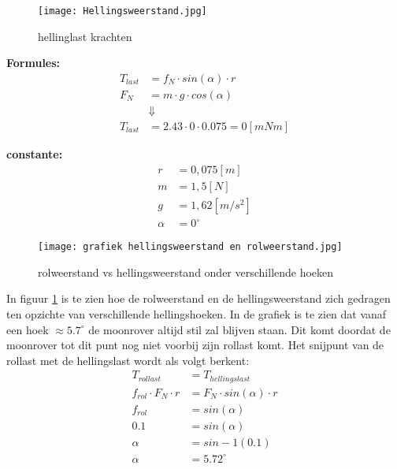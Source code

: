     \begin{figure}[H]
        \centering
        \texttt{[image: Hellingsweerstand.jpg]}
        \caption{hellinglast krachten}
    \end{figure}

    \begin{multicols}{2}
        \textbf{Formules:}
        \begin{equation}
            \begin{split}
                T_{last} &= f_{N} \cdot sin(\alpha) \cdot r \\
                F_{N} &= m \cdot g \cdot cos(\alpha) \\
                &\Downarrow \\
                T_{last} &= 2.43 \cdot 0 \cdot 0.075 = 0 [mNm]
            \end{split}
        \end{equation}

        \textbf{constante:}
        \begin{equation*}
            \begin{split}
                r &= 0,075 [m] \\
                m &= 1,5 [N] \\
                g &= 1,62 [m/s^2] \\
                \alpha &= 0^\circ 
            \end{split}
        \end{equation*}
    \end{multicols}

    \begin{figure}[H]
        \centering
        \texttt{[image: grafiek hellingsweerstand en rolweerstand.jpg]}
        \caption{rolweerstand vs hellingsweerstand onder verschillende hoeken}
        \label{fig:birds}
    \end{figure}

    In figuur \ref{fig:birds} is te zien hoe de rolweerstand en de hellingsweerstand zich gedragen ten opzichte van verschillende hellingshoeken. In de grafiek is te zien dat vanaf een hoek $\approx 5.7^\circ$ de moonrover altijd stil zal blijven staan. Dit komt doordat de moonrover tot dit punt nog niet voorbij zijn rollast komt. Het snijpunt van de rollast met de hellingslast wordt als volgt berkent:
    \begin{equation}
        \begin{split}
            T_{rollast} &= T_{hellingslast} \\
            f_{rol} \cdot F_{N} \cdot r &= F_{N} \cdot sin(\alpha) \cdot r \\
            f_{rol} &= sin(\alpha) \\
            0.1 &= sin(\alpha) \\
            \alpha &= sin-1(0.1) \\
            \alpha &= 5.72^\circ
        \end{split}
    \end{equation}

